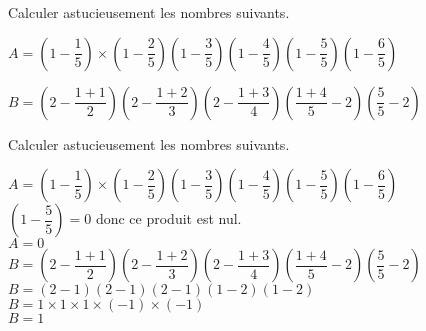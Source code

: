 \begin{exercice*}
    Calculer astucieusement les nombres suivants. 

    \hspace*{-10mm}
    \begin{minipage}{\linewidth}   
        \begin{list}{}{}
            \begin{spacing}{1.5}
                \item \mbox{$A=\left(1-\dfrac15\right)\times\left(1-\dfrac25\right)\left(1-\dfrac35\right)\left(1-\dfrac45\right)\left(1-\dfrac55\right)\left(1-\dfrac65\right)$}
                \item $B=\left(2-\dfrac{1+1}{2}\right)\left(2-\dfrac{1+2}{3}\right)\left(2-\dfrac{1+3}{4}\right)\left(\dfrac{1+4}{5}-2\right)\left(\dfrac{5}{5}-2\right)$
            \end{spacing}
        \end{list}    
    \end{minipage}
\end{exercice*}
\begin{corrige}
    Calculer astucieusement les nombres suivants.
    \hspace*{-7mm}
    \begin{minipage}{\linewidth}   
        \begin{spacing}{2}
            \begin{itemize}
                \def\item{}
                \item $A=\left(1-\dfrac15\right)\times\left(1-\dfrac25\right)\left(1-\dfrac35\right)\left(1-\dfrac45\right)\left(1-\dfrac55\right)\left(1-\dfrac65\right)$\\
                {\red $\left(1-\dfrac{5}{5}\right)=0$ donc ce produit est nul.\\$A=0$}\\
                \item $B=\left(2-\dfrac{1+1}{2}\right)\left(2-\dfrac{1+2}{3}\right)\left(2-\dfrac{1+3}{4}\right)\left(\dfrac{1+4}{5}-2\right)\left(\dfrac{5}{5}-2\right)$\\
                {\red $B=(2-1)(2-1)(2-1)(1-2)(1-2)$\\$B=1\times 1\times 1\times (-1)\times (-1)$\\$B=1$}
            \end{itemize}
        \end{spacing}
    \end{minipage}
\end{corrige}

